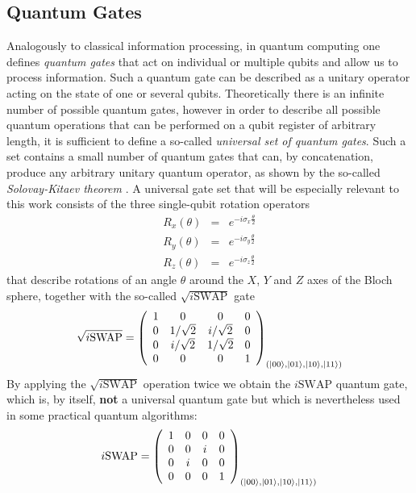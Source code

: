 \subsection{Quantum Gates}

Analogously to classical information processing, in quantum computing one defines {\it quantum gates} that act on individual or multiple qubits and allow us to process information. Such a quantum gate can be described as a unitary operator acting on the state of one or several qubits. Theoretically there is an infinite number of possible quantum gates, however in order to describe all possible quantum operations that can be performed on a qubit register of arbitrary length, it is sufficient to define a so-called {\it universal set of quantum gates}. Such a set contains a small number of quantum gates that can, by concatenation, produce any arbitrary unitary quantum operator, as shown by the so-called {\it Solovay-Kitaev theorem} \citep{nielsen_quantum_2000,dawson_solovay-kitaev_2005}. A universal gate set that will be especially relevant to this work consists of the three single-qubit rotation operators
%
\begin{eqnarray}
   R_x(\theta)  & = & e^{-i\sigma_x\frac{\theta}{2}} \\ 
   R_y(\theta)  & = & e^{-i\sigma_y\frac{\theta}{2}} \\ 
   R_z(\theta)  & = & e^{-i\sigma_z\frac{\theta}{2}} 
\label{eq:universal_single_qubit_gates}
\end{eqnarray}
%
that describe rotations of an angle $\theta$ around the $X$, $Y$ and $Z$ axes of the Bloch sphere, together with the so-called $\sqrt{i\mathrm{SWAP}}$ gate
%
\begin{equation}
\sqrt{i\mathrm{SWAP}} = \left( \begin{array}{cccc} 1 & 0 & 0 & 0 \\ 0 & 1/\sqrt{2} & i/\sqrt{2} & 0 \\ 0 & i/\sqrt{2} & 1/\sqrt{2} & 0 \\ 0 & 0 & 0 & 1  \end{array}  \right)_{(\left| 00 \right>,\left| 01 \right>,\left| 10 \right>,\left| 11 \right>)}
\end{equation}
%
By applying the $\sqrt{i\mathrm{SWAP}}$ operation twice we obtain the $i\mathrm{SWAP}$ quantum gate, which is, by itself, \textbf{not} a universal quantum gate but which is nevertheless used in some practical quantum algorithms:
%
\begin{equation}
i\mathrm{SWAP} = \left( \begin{array}{cccc} 1 & 0 & 0 & 0 \\ 0 & 0 & i & 0 \\ 0 & i & 0 & 0 \\ 0 & 0 & 0 & 1  \end{array}  \right)_{(\left| 00 \right>,\left| 01 \right>,\left| 10 \right>,\left| 11 \right>)}
\end{equation}
%

